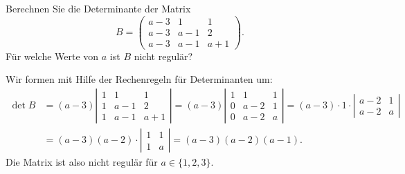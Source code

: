 Berechnen Sie die Determinante der Matrix
\[
B
=
\begin{pmatrix}
a-3&  1&  1\\
a-3&a-1&  2\\
a-3&a-1&a+1
\end{pmatrix}.
\]
Für welche Werte von $a$ ist $B$ nicht regulär?

\begin{loesung}
Wir formen mit Hilfe der Rechenregeln für Determinanten um:
\begin{align*}
\det B
&=
(a-3)\left|\begin{matrix}
1&  1&  1\\
1&a-1&  2\\
1&a-1&a+1
\end{matrix}\right|
=
(a-3)\left|\begin{matrix}
1&  1&  1\\
0&a-2&  1\\
0&a-2&a
\end{matrix}\right|
=
(a-3)\cdot 1\cdot
\left|\begin{matrix}
a-2&  1\\
a-2&  a
\end{matrix}\right|
\\
&=
(a-3)(a-2)\cdot
\left|\begin{matrix}
1&  1\\
1&  a
\end{matrix}\right|
=
(a-3)(a-2)(a-1).
\end{align*}
Die Matrix ist also nicht regulär für $a\in\{1,2,3\}$.
\end{loesung}


